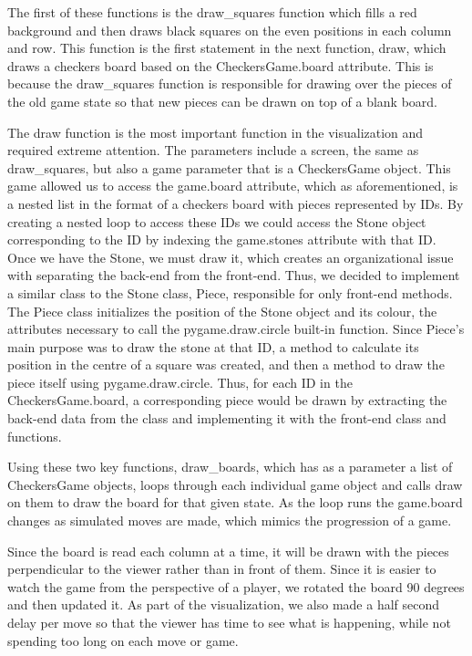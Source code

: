 \documentclass[fontsize=11pt]{article}
\begin{document}
The first of these functions is the draw\_squares function which fills a red background and then draws black squares on the even positions in each column and row. This function is the first statement in the next function, draw,  which draws a checkers board based on the CheckersGame.board attribute. This is because the draw\_squares function is responsible for drawing over the pieces of the old game state so that new pieces can be drawn on top of a blank board.

The draw function is the most important function in the visualization and required extreme attention. The parameters include a screen, the same as draw\_squares, but also a game parameter that is a CheckersGame object. This game allowed us to access the game.board attribute, which as aforementioned, is a nested list in the format of a checkers board with pieces represented by IDs. By creating a nested loop to access these IDs we could access the Stone object corresponding to the ID by indexing the game.stones attribute with that ID. Once we have the Stone, we must draw it, which creates an organizational issue with separating the back-end from the front-end. Thus, we decided to implement a similar class to the Stone class, Piece, responsible for only front-end methods. The Piece class initializes the position of the Stone object and its colour, the attributes necessary to call the pygame.draw.circle built-in function. Since Piece's main purpose was to draw the stone at that ID, a method to calculate its position in the centre of a square was created, and then a method to draw the piece itself using pygame.draw.circle. Thus, for each ID in the CheckersGame.board, a corresponding piece would be drawn by extracting the back-end data from the class and implementing it with the front-end class and functions.

Using these two key functions, draw\_boards, which has as a parameter a list of CheckersGame objects, loops through each individual game object and calls draw on them to draw the board for that given state. As the loop runs the game.board changes as simulated moves are made, which mimics the progression of a game.

Since the board is read each column at a time, it will be drawn with the pieces perpendicular to the viewer rather than in front of them. Since it is easier to watch the game from the perspective of a player, we rotated the board 90 degrees and then updated it. As part of the visualization, we also made a half second delay per move so that the viewer has time to see what is happening, while not spending too long on each move or game. 
\end{document}
